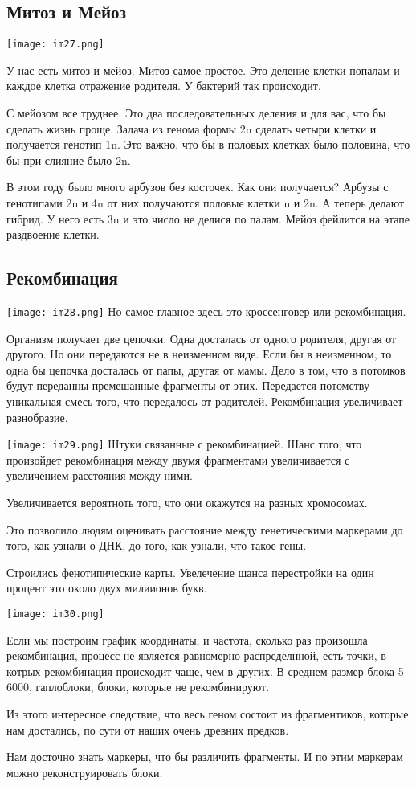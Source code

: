 \subsection{Митоз и Мейоз}
\texttt{[image: im27.png]}

У нас есть митоз и мейоз. Митоз самое простое. Это 
деление клетки попалам и каждое клетка 
отражение родителя. У бактерий так происходит. 

С мейозом все труднее. Это два последовательных деления и для вас, 
что бы сделать жизнь проще. Задача из генома формы 2n 
сделать четыри клетки и получается генотип 1n. Это
важно, что бы в половых клетках было половина, что
бы при слияние было 2n.

В этом году было много арбузов без косточек.
Как они получается? Арбузы с генотипами 2n и 4n от
них получаются половые клетки n и 2n. А теперь
делают гибрид. У него есть 3n и это число не делися по палам.
Мейоз фейлится на этапе раздвоение клетки.   


\subsection{Рекомбинация}
\texttt{[image: im28.png]}
Но самое главное здесь это кроссенговер или рекомбинация. 

Организм получает две цепочки. Одна досталась от одного родителя,
другая от другого. Но они передаются не в неизменном виде. Если бы 
в неизменном, то одна бы цепочка досталась от папы, другая от мамы. 
Дело в том, что в потомков будут переданны премешанные фрагменты от 
этих. Передается потомству уникальная смесь того, что передалось от родителей. 
Рекомбинация увеличивает разнобразие. 

\texttt{[image: im29.png]}
Штуки связанные с рекомбинацией. Шанс того, что произойдет 
рекомбинация между двумя фрагментами увеличивается с увеличением расстояния между ними. 

Увеличивается вероятноть того, что они окажутся на разных хромосомах. 

Это позволило людям оценивать расстояние между генетическими маркерами до того, 
как узнали о ДНК, до того, как узнали, что такое гены.

Строились фенотипические карты. Увелечение шанса перестройки на один процент это около двух милиионов букв. 

\texttt{[image: im30.png]}

Если мы построим график координаты, и частота, сколько раз произошла рекомбинация, 
процесс не является равномерно распределнной, есть точки, в котрых рекомбинация происходит 
чаще, чем в других. В среднем размер блока 5-6000, гаплоблоки, блоки, которые не рекомбинируют. 

Из этого интересное следствие, что весь геном состоит из фрагментиков, 
которые нам достались, по сути от наших очень древних предков. 

Нам досточно знать маркеры, что бы различить фрагменты. И по этим маркерам 
можно реконструировать блоки. 

